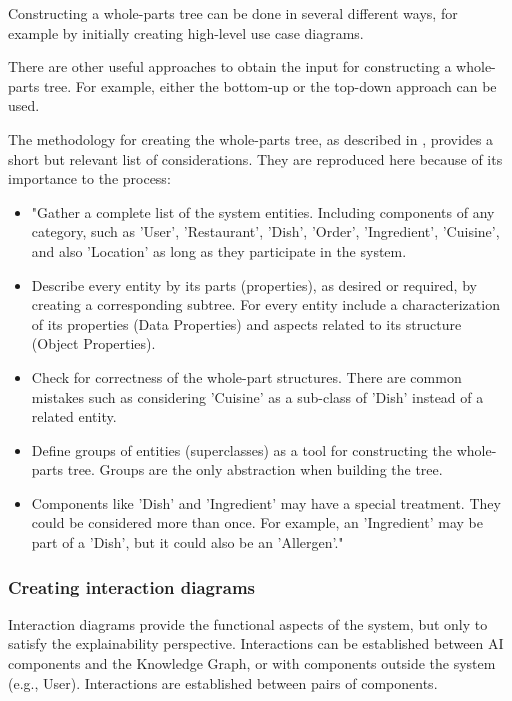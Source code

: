 \documentclass[preprint,10pt]{elsarticle}
\begin{document}
Constructing a whole-parts tree can be done in several different ways, for example by initially creating high-level use case diagrams.

There are other useful approaches to obtain the input for constructing a whole-parts tree. For example, either the bottom-up or the top-down approach can be used.

The methodology for creating the whole-parts tree, as described in , provides a short but relevant list of considerations. They are reproduced here because of its importance to the process:

\begin{itemize}
    \item "Gather a complete list of the system entities. Including components of any category, such as 'User', 'Restaurant', 'Dish', 'Order', 'Ingredient', 'Cuisine', and also 'Location' as long as they participate in the system.
    \item Describe every entity by its parts (properties), as desired or required, by creating a corresponding subtree. For every entity include a characterization of its properties (Data Properties) and aspects related to its structure (Object Properties).
    \item Check for correctness of the whole-part structures. There are common mistakes such as considering 'Cuisine' as a sub-class of 'Dish' instead of a related entity.
    \item Define groups of entities (superclasses) as a tool for constructing the whole-parts tree. Groups are the only abstraction when building the tree.
    \item Components like 'Dish' and 'Ingredient' may have a special treatment. They could be considered more than once. For example, an 'Ingredient' may be part of a 'Dish', but it could also be an 'Allergen'."
\end{itemize}

\subsubsection{Creating interaction diagrams}

Interaction diagrams provide the functional aspects of the system, but only to satisfy the explainability perspective. Interactions can be established between AI components and the Knowledge Graph, or with components outside the system (e.g., User). Interactions are established between pairs of components.
\end{document}
